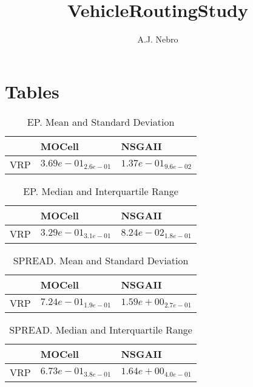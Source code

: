 \documentclass{article}
\title{VehicleRoutingStudy}
\author{A.J. Nebro}
\begin{document}
\maketitle
\section{Tables}

\begin{table}
\caption{EP. Mean and Standard Deviation}
\label{table: EP}
\centering
\begin{scriptsize}
\begin{tabular}{lll}
\hline & MOCell &  NSGAII\\
\hline 
VRP & \cellcolor{gray25}$  3.69e-01_{ 2.6e-01}$ & \cellcolor{gray95}$  1.37e-01_{ 9.6e-02}$ \\
\hline
\end{tabular}
\end{scriptsize}
\end{table}

\begin{table}
\caption{EP. Median and Interquartile Range}
\label{table: EP}
\centering
\begin{scriptsize}
\begin{tabular}{lll}
\hline & MOCell &  NSGAII\\
\hline 
VRP & \cellcolor{gray25}$  3.29e-01_{ 3.1e-01}$ & \cellcolor{gray95}$  8.24e-02_{ 1.8e-01}$ \\
\hline
\end{tabular}
\end{scriptsize}
\end{table}

\begin{table}
\caption{SPREAD. Mean and Standard Deviation}
\label{table: SPREAD}
\centering
\begin{scriptsize}
\begin{tabular}{lll}
\hline & MOCell &  NSGAII\\
\hline 
VRP & \cellcolor{gray95}$  7.24e-01_{ 1.9e-01}$ & \cellcolor{gray25}$  1.59e+00_{ 2.7e-01}$ \\
\hline
\end{tabular}
\end{scriptsize}
\end{table}

\begin{table}
\caption{SPREAD. Median and Interquartile Range}
\label{table: SPREAD}
\centering
\begin{scriptsize}
\begin{tabular}{lll}
\hline & MOCell &  NSGAII\\
\hline 
VRP & \cellcolor{gray95}$  6.73e-01_{ 3.8e-01}$ & \cellcolor{gray25}$  1.64e+00_{ 4.0e-01}$ \\
\hline
\end{tabular}
\end{scriptsize}
\end{table}
\end{document}
